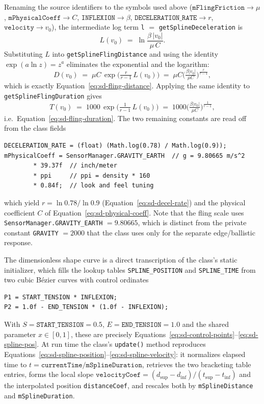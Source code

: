 Renaming the source identifiers to the symbols used above ($\texttt{mFlingFriction}\!\to\!\mu$, $\texttt{mPhysicalCoeff}\!\to\!C$, $\texttt{INFLEXION}\!\to\!\beta$, $\texttt{DECELERATION\_RATE}\!\to\!r$, $\texttt{velocity}\!\to\!v_0$), the intermediate log term \texttt{l} $=$ \texttt{getSplineDeceleration} is
\begin{equation}
  L(v_0) \;=\; \ln\!\frac{\beta\,\lvert v_0\rvert}{\mu\,C}.
  \label{eq:sd-spline-decel}
\end{equation}
Substituting $L$ into \texttt{getSplineFlingDistance} and using the identity $\exp(a\ln z)=z^{a}$ eliminates the exponential and the logarithm:
\begin{equation}
  D(v_0)
  \;=\;
  \mu C\,\exp\!\Big(\tfrac{r}{r-1}\,L(v_0)\Big)
  \;=\;
  \mu C\Big(\tfrac{\beta\lvert v_0\rvert}{\mu C}\Big)^{\!\frac{r}{r-1}},
\end{equation}
which is exactly Equation~\eqref{eq:sd-fling-distance}. Applying the same identity to \texttt{getSplineFlingDuration} gives
\begin{equation}
  T(v_0)
  \;=\;
  1000\,\exp\!\Big(\tfrac{1}{r-1}\,L(v_0)\Big)
  \;=\;
  1000\Big(\tfrac{\beta\lvert v_0\rvert}{\mu C}\Big)^{\!\frac{1}{r-1}},
\end{equation}
i.e.\ Equation~\eqref{eq:sd-fling-duration}. The two remaining constants are read off from the class fields
\begin{verbatim}
DECELERATION_RATE = (float) (Math.log(0.78) / Math.log(0.9));
mPhysicalCoeff = SensorManager.GRAVITY_EARTH  // g = 9.80665 m/s^2
        * 39.37f  // inch/meter
        * ppi     // ppi = density * 160
        * 0.84f;  // look and feel tuning
\end{verbatim}
which yield $r = \ln 0.78 / \ln 0.9$ (Equation~\eqref{eq:sd-decel-rate}) and the physical coefficient $C$ of Equation~\eqref{eq:sd-physical-coeff}. Note that the fling scale uses \texttt{SensorManager.GRAVITY\_EARTH} $=9.80665$, which is distinct from the private constant \texttt{GRAVITY} $=2000$ that the class uses only for the separate edge/ballistic response.

The dimensionless shape curve is a direct transcription of the class's static initializer, which fills the lookup tables \texttt{SPLINE\_POSITION} and \texttt{SPLINE\_TIME} from two cubic B\'ezier curves with control ordinates
\begin{verbatim}
P1 = START_TENSION * INFLEXION;
P2 = 1.0f - END_TENSION * (1.0f - INFLEXION);
\end{verbatim}
With $S=\texttt{START\_TENSION}=0.5$, $E=\texttt{END\_TENSION}=1.0$ and the shared parameter $x\in[0,1]$, these are precisely Equations~\eqref{eq:sd-control-points}--\eqref{eq:sd-spline-pos}. At run time the class's \texttt{update()} method reproduces Equations~\eqref{eq:sd-spline-position}--\eqref{eq:sd-spline-velocity}: it normalizes elapsed time to $t=\texttt{currentTime}/\texttt{mSplineDuration}$, retrieves the two bracketing table entries, forms the local slope $\texttt{velocityCoef}=(d_{\sup}-d_{\inf})/(t_{\sup}-t_{\inf})$ and the interpolated position \texttt{distanceCoef}, and rescales both by \texttt{mSplineDistance} and \texttt{mSplineDuration}.

